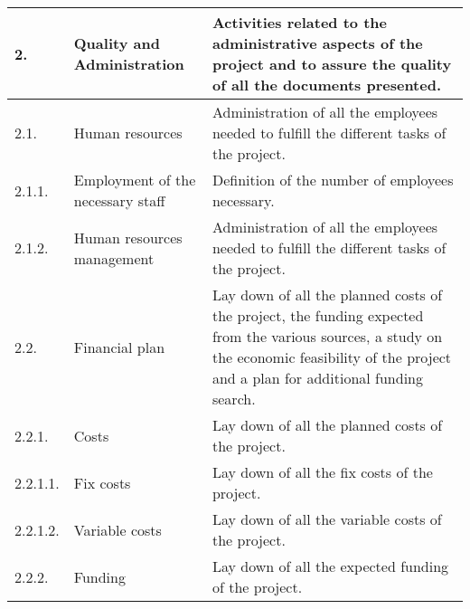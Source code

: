 \begin{longtable}[H]{l >{\raggedright\arraybackslash}p{4cm} p{8cm}}
	\midrule
	
	2. & Quality and Administration & Activities related to the administrative aspects of the project and to assure the quality of all the documents presented.\vspace{0.2cm} \\
	
	\midrule
	
	2.1. & Human resources & Administration of all the employees needed to fulfill the different tasks of the project.\vspace{0.2cm} \\
	
	\midrule
	
	2.1.1. & Employment of the necessary staff & Definition of the number of employees necessary.\vspace{0.2cm} \\
	
	\midrule
	
	2.1.2. & Human resources management & Administration of all the employees needed to fulfill the different tasks of the project.\vspace{0.2cm} \\
	
	\midrule
	
	2.2. & Financial plan & Lay down of all the planned costs of the project, the funding expected from the various sources, a study on the economic feasibility of the project and a plan for additional funding search.\vspace{0.2cm} \\
	
	\midrule
	
	2.2.1. & Costs & Lay down of all the planned costs of the project.\vspace{0.2cm} \\
	
	\midrule
	
	2.2.1.1. & Fix costs & Lay down of all the fix costs of the project.\vspace{0.2cm} \\
	
	\midrule
	
	2.2.1.2. & Variable costs & Lay down of all the variable costs of the project.\vspace{0.2cm} \\
	
	\midrule
	
	2.2.2. & Funding & Lay down of all the expected funding of the project.\vspace{0.2cm} \\
	

\end{longtable}
